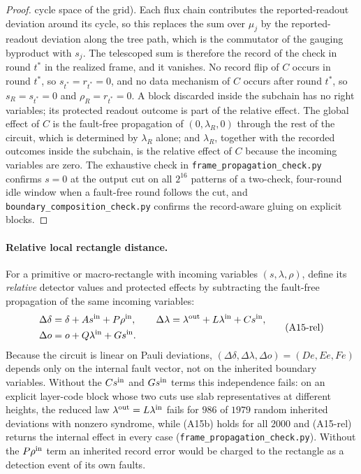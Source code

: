 \documentclass[aps,prx,reprint,superscriptaddress,nofootinbib,floatfix,longbibliography]{revtex4-2}
\theoremstyle{definition}
\begin{document}
\begin{proof}
cycle space of the grid).  Each flux chain contributes the reported-readout
deviation around its cycle, so this replaces the sum over $\mu_j$ by the
reported-readout deviation along the tree path, which is the commutator of
the gauging byproduct with $s_j$.
The telescoped sum is therefore the record of the check in round $t^\ast$ in
the realized frame, and it vanishes.  No record flip of $C$ occurs in round
$t^\ast$, so $s_{t^\ast}=r_{t^\ast}=0$, and no data mechanism of $C$ occurs
after round $t^\ast$, so $s_R=s_{t^\ast}=0$ and $\rho_R=r_{t^\ast}=0$.  A block
discarded inside the subchain has no right variables; its protected readout
outcome is part of the relative effect.  The global effect of
$C$ is the fault-free propagation of $(0,\lambda_R,0)$ through the rest of the
circuit, which is determined by $\lambda_R$ alone; and $\lambda_R$, together
with the recorded outcomes inside the subchain, is the relative effect of $C$
because the incoming variables are zero.  The exhaustive check in
\texttt{frame\_propagation\_check.py} confirms $s=0$ at the output cut on all
$2^{16}$ patterns of a two-check, four-round idle window when a fault-free
round follows the cut, and \texttt{boundary\_composition\_check.py} confirms
the record-aware gluing on explicit blocks.
\end{proof}

\paragraph{Relative local rectangle distance.}
For a primitive or macro-rectangle with incoming variables
$(s,\lambda,\rho)$, define its \emph{relative} detector values and protected
effects by subtracting the fault-free propagation of the same incoming
variables:
\begin{equation}
\begin{aligned}
 \Delta\delta&=\delta+A s^{\rm in}+P\rho^{\rm in},\qquad
 \Delta\lambda=\lambda^{\rm out}+L\lambda^{\rm in}+Cs^{\rm in},\\
 \Delta o&=o+Q\lambda^{\rm in}+Gs^{\rm in}.
\end{aligned}
 \tag{A15-rel}
\end{equation}
Because the circuit is linear on Pauli deviations,
$(\Delta\delta,\Delta\lambda,\Delta o)=(De,Ee,Fe)$ depends only on the internal
fault vector, not on the inherited boundary variables.  Without the
$Cs^{\rm in}$ and $Gs^{\rm in}$ terms this independence fails: on an explicit
layer-code block whose two cuts use slab representatives at different heights,
the reduced law $\lambda^{\rm out}=L\lambda^{\rm in}$ fails for $986$ of $1979$
random inherited deviations with nonzero syndrome, while (A15b) holds for all
$2000$ and (A15-rel) returns the internal effect in every case
(\texttt{frame\_propagation\_check.py}).  Without the $P\rho^{\rm in}$ term an
inherited record error would be charged to the rectangle as a detection
event of its own faults.
\end{document}
